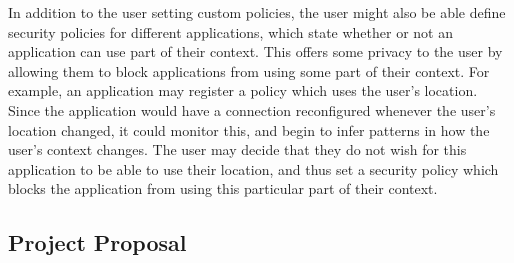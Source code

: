 \documentclass[12pt,twoside,notitlepage]{report}
\begin{document}
In addition to the user setting custom policies, the user might also be able define security policies for different applications, which state whether or not an application can use part of their context. 
This offers some privacy to the user by allowing them to block applications from using some part of their context. 
For example, an application may register a policy which uses the user's location. 
Since the application would have a connection reconfigured whenever the user's location changed, it could monitor this, and begin to infer patterns in how the user's context changes. 
The user may decide that they do not wish for this application to be able to use their location, and thus set a security policy which blocks the application from using this particular part of their context. 

\cleardoublepage


\nocite{*}


\cleardoublepage

\begin{appendix}

\chapter{Project Proposal}



\end{appendix}
\end{document}
